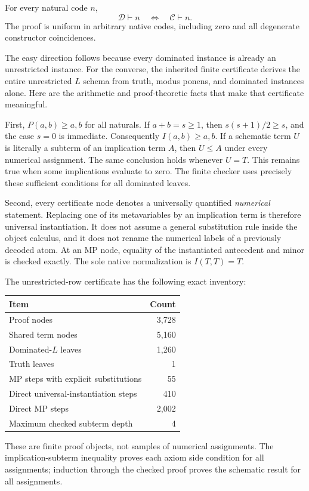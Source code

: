 \begin{theorem}
For every natural code $n$,
\[
                  \mathcal D\vdash n
             \quad\Longleftrightarrow\quad
                  \mathcal C\vdash n.
\]
The proof is uniform in arbitrary native codes, including zero and
all degenerate constructor coincidences.
\end{theorem}

The easy direction follows because every dominated instance is already
an unrestricted instance.  For the converse, the inherited finite
certificate derives the entire unrestricted $L$ schema from truth,
modus ponens, and dominated instances alone.  Here are the arithmetic
and proof-theoretic facts that make that certificate meaningful.

First, $P(a,b)\ge a,b$ for all naturals.  If $a+b=s\ge1$, then
$s(s+1)/2\ge s$, and the case $s=0$ is immediate.  Consequently
$I(a,b)\ge a,b$.  If a schematic term $U$ is literally a subterm of an
implication term $A$, then $U\le A$ under every numerical assignment.
The same conclusion holds whenever $U=T$.  This remains true when some
implications evaluate to zero.  The finite checker uses precisely these
sufficient conditions for all dominated leaves.

Second, every certificate node denotes a universally quantified
\emph{numerical} statement.  Replacing one of its metavariables by an
implication term is therefore universal instantiation.  It does not
assume a general substitution rule inside the object calculus, and it
does not rename the numerical labels of a previously decoded atom.
At an MP node, equality of the instantiated antecedent and minor is
checked exactly.  The sole native normalization is $I(T,T)=T$.

The unrestricted-row certificate has the following exact inventory:
\begin{center}
\begin{tabular}{lr}
\hline
Item & Count\\
\hline
Proof nodes & 3,728\\
Shared term nodes & 5,160\\
Dominated-$L$ leaves & 1,260\\
Truth leaves & 1\\
MP steps with explicit substitutions & 55\\
Direct universal-instantiation steps & 410\\
Direct MP steps & 2,002\\
Maximum checked subterm depth & 4\\
\hline
\end{tabular}
\end{center}
These are finite proof objects, not samples of numerical assignments.
The implication-subterm inequality proves each axiom side condition for
all assignments; induction through the checked proof proves the
schematic result for all assignments.


